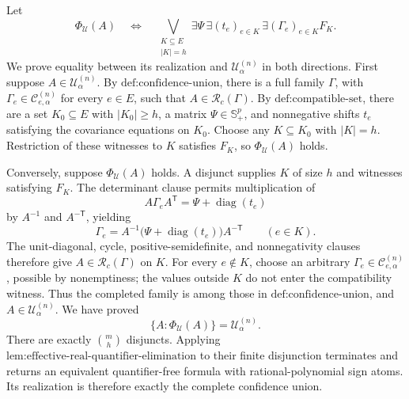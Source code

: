 Let
\[
\Phi_{\mathcal U}(A)
\quad\Longleftrightarrow\quad
\bigvee_{\substack{K\subseteq E\\|K|=h}}
\exists\Psi\,\exists(t_e)_{e\in K}\,\exists(\Gamma_e)_{e\in K} F_K.
\]
We prove equality between its realization and \(\mathcal U^{(n)}_\alpha\) in both directions. First suppose \(A\in\mathcal U^{(n)}_\alpha\). By \(\text{def:confidence-union}\), there is a full family \(\Gamma\), with \(\Gamma_e\in\mathcal C^{(n)}_{e,\alpha}\) for every \(e\in E\), such that \(A\in\mathcal R_c(\Gamma)\). By \(\text{def:compatible-set}\), there are a set \(K_0\subseteq E\) with \(|K_0|\geq h\), a matrix \(\Psi\in\mathbb S_+^p\), and nonnegative shifts \(t_e\) satisfying the covariance equations on \(K_0\). Choose any \(K\subseteq K_0\) with \(|K|=h\). Restriction of these witnesses to \(K\) satisfies \(F_K\), so \(\Phi_{\mathcal U}(A)\) holds.

Conversely, suppose \(\Phi_{\mathcal U}(A)\) holds. A disjunct supplies \(K\) of size \(h\) and witnesses satisfying \(F_K\). The determinant clause permits multiplication of
\[
A\Gamma_eA^{\mathsf T}=\Psi+\operatorname{diag}(t_e)
\]
by \(A^{-1}\) and \(A^{-\mathsf T}\), yielding
\[
\Gamma_e=A^{-1}\bigl(\Psi+\operatorname{diag}(t_e)\bigr)A^{-\mathsf T}
\qquad(e\in K).
\]
The unit-diagonal, cycle, positive-semidefinite, and nonnegativity clauses therefore give \(A\in\mathcal R_c(\Gamma)\) on \(K\). For every \(e\notin K\), choose an arbitrary \(\Gamma_e\in\mathcal C^{(n)}_{e,\alpha}\), possible by nonemptiness; the values outside \(K\) do not enter the compatibility witness. Thus the completed family is among those in \(\text{def:confidence-union}\), and \(A\in\mathcal U^{(n)}_\alpha\). We have proved
\[
\{A:\Phi_{\mathcal U}(A)\}=\mathcal U^{(n)}_\alpha.
\]
There are exactly \(\binom mh\) disjuncts. Applying \(\text{lem:effective-real-quantifier-elimination}\) to their finite disjunction terminates and returns an equivalent quantifier-free formula with rational-polynomial sign atoms. Its realization is therefore exactly the complete confidence union.

